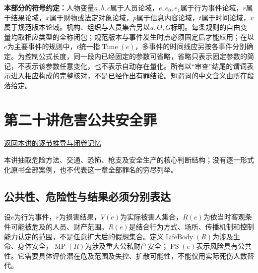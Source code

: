 \noindent\textbf{本部分的符号约定：}人物变量$a,b,c$属于人员论域，$e,e_0,e_1$属于行为事件论域，$r$属于结果论域，$x$属于财物或法定对象论域，$p$属于信息内容论域，$t$属于时间论域，$v$属于规范版本论域。机构、组织与人员集合另以$u,O,G$标明。每条规则的自由变量均取相应类型的全称闭包；规范版本与事件发生时点必须固定后才能应用；在以$e$为主要事件的规则中，$t$统一指$\operatorname{Time}(e)$，多事件的时间线应另按各事件分别确定。为控制公式长度，同一段内已经固定的参数可省略，省略只表示固定参数的简记，不表示该参数任意变化，也不表示自动存在量化。所有以“审查”结尾的谓词表示进入相应构成的完整核对，不是已经作出有罪结论。短谓词的中文含义由所在段落给定。

\section{第二十讲\quad 危害公共安全罪}

\label{ref:lecture:20}

\noindent\hyperref[lecture:20]{返回本讲的逐节推导与闭卷记忆}

本讲抽取危险方法、交通、恐怖、枪支及安全生产的核心判断结构；没有逐一形式化原书全部案例，也不代表这一章全部罪名的穷尽列举。

\subsection{公共性、危险性与结果必须分别表达}
设$e$为行为事件，$r$为损害结果，$V(e)$为实际被害人集合，$R(e)$为依当时客观条件可能被危及的人员、财产范围。$R(e)$是结合行为方式、场所、传播机制和控制能力认定的范围，不是任意扩大后的假想集合。定义$\operatorname{LifeBody}(R)$为涉及生命、身体安全，$\operatorname{MP}(R)$为涉及重大公私财产安全；$\operatorname{PS}(e)$表示风险具有公共性。它需要具体评价潜在危及范围及失控、扩散可能性，不能仅用实际死伤人数替代。

